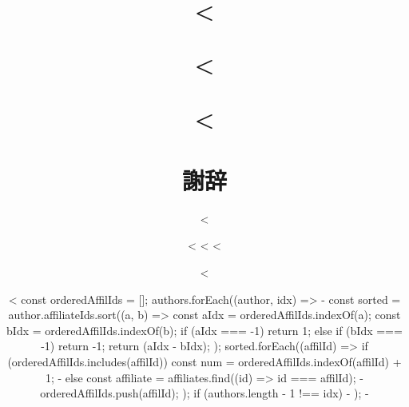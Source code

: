 \documentclass[dvipdfmx,uplatex,twoside]{wiss}
\newcommand*\sameaffil[1][\value{footnote}]{\footnotemark[#1]}
\begin{document}
\title{<%
\etitle{}

\author{
<%
const orderedAffilIds = [];
authors.forEach((author, idx) => {
  -%
  const sorted =
    author.affiliateIds.sort((a, b) => {
      const aIdx = orderedAffilIds.indexOf(a);
      const bIdx = orderedAffilIds.indexOf(b);
      if (aIdx === -1) {
        return 1;
      } else if (bIdx === -1) {
        return -1;
      }
      return (aIdx - bIdx);
    });
  sorted.forEach((affilId) => {
    if (orderedAffilIds.includes(affilId)) {
      const num = orderedAffilIds.indexOf(affilId) + 1;
      -%
    } else {
      const affiliate = affiliates.find(({id}) => id === affilId);
      -%
      orderedAffilIds.push(affilId);
    }
  });
  if (authors.length - 1 !== idx) {
    -%
  }
});
-%
}

\begin{abstract}

\end{abstract}

\maketitle

<%

<%
\section*{謝辞}

<%

<%
\balance
<%
\nobalance
<%



<%
}
\end{document}
